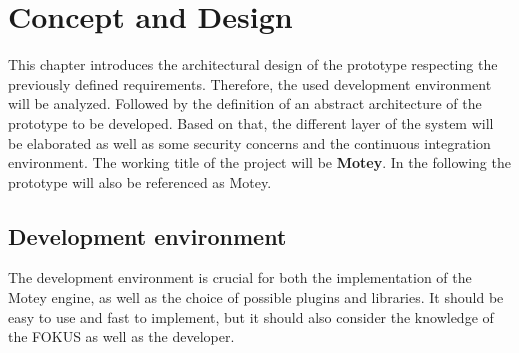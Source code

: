 \chapter{Concept and Design}
\label{chapter:concept}
\minitoc\vspace{.5cm}
This chapter introduces the architectural design of the prototype respecting the previously defined requirements.
Therefore, the used development environment will be analyzed.
Followed by the definition of an abstract architecture of the prototype to be developed.
Based on that, the different layer of the system will be elaborated as well as some security concerns and the continuous integration environment.
The working title of the project will be \textbf{Motey}.
In the following the prototype will also be referenced as Motey.


\section{Development environment}
The development environment is crucial for both the implementation of the Motey engine, as well as the choice of possible plugins and libraries.
It should be easy to use and fast to implement, but it should also consider the knowledge of the \ac{FOKUS} as well as the developer.

%

